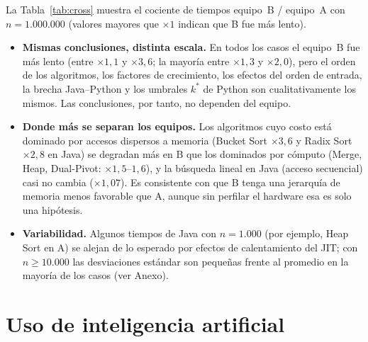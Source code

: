 \documentclass[11pt,a4paper]{article}
\begin{document}
La Tabla~\ref{tab:cross} muestra el cociente de tiempos equipo~B / equipo~A con $n=1.000.000$ (valores mayores
que $\times1$ indican que B fue m\'as lento).

\begin{table}[htbp]
\centering
\caption{Cociente de tiempos B/A con $n=1.000.000$ (entrada aleatoria para ordenamiento; 1.000 claves para
b\'usqueda).}\label{tab:cross}

\end{table}

\begin{itemize}
  \item \textbf{Mismas conclusiones, distinta escala.} En todos los casos el equipo~B fue m\'as lento (entre
  $\times1{,}1$ y $\times3{,}6$; la mayor\'ia entre $\times1{,}3$ y $\times2{,}0$), pero el orden de los
  algoritmos, los factores de crecimiento, los efectos del orden de entrada, la brecha Java--Python y los
  umbrales $k^*$ de Python son cualitativamente los mismos. Las conclusiones, por tanto, no dependen del
  equipo.
  \item \textbf{Donde m\'as se separan los equipos.} Los algoritmos cuyo costo est\'a dominado por accesos
  dispersos a memoria (Bucket Sort $\times3{,}6$ y Radix Sort $\times2{,}8$ en Java) se degradan m\'as en B que los
  dominados por c\'omputo (Merge, Heap, Dual-Pivot: $\times1{,}5$--$1{,}6$), y la b\'usqueda lineal en Java (acceso
  secuencial) casi no cambia ($\times1{,}07$). Es consistente con que B tenga una jerarqu\'ia de memoria menos
  favorable que A, aunque sin perfilar el hardware esa es solo una hip\'otesis.
  \item \textbf{Variabilidad.} Algunos tiempos de Java con $n=1.000$ (por ejemplo, Heap Sort en A) se alejan de
  lo esperado por efectos de calentamiento del JIT; con $n\ge10.000$ las desviaciones est\'andar son peque\~nas
  frente al promedio en la mayor\'ia de los casos (ver Anexo).
\end{itemize}

\section{Uso de inteligencia artificial}
\end{document}
